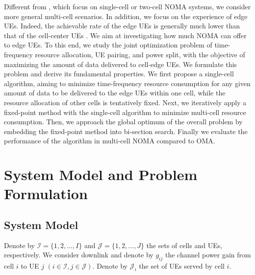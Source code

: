\documentclass[10pt,journal,final,finalsubmission,twocolumn]{IEEEtran}
\begin{document}
Different from \cite{Do1, Do2, Guo, Pei}, which focus on single-cell or two-cell NOMA systems, we consider more general multi-cell scenarios. In addition, we focus on the experience of edge UEs. Indeed, the achievable rate of the edge UEs is generally much lower than that of the cell-center UEs \cite{Dai}. We aim at investigating how much NOMA can offer to edge UEs. To this end, we study the joint optimization problem of time-frequency resource allocation, UE pairing, and power split, with the objective of maximizing the amount of data delivered to cell-edge UEs. We formulate this problem and derive its fundamental properties. We first propose a single-cell algorithm, aiming to minimize time-frequency resource consumption for any given amount of data to be delivered to the edge UEs within one cell, while the resource allocation of other cells is tentatively fixed. Next, we iteratively apply a fixed-point method with the single-cell algorithm to minimize multi-cell resource consumption. Then, we approach the global optimum of the overall problem by embedding the fixed-point method into bi-section search. Finally we evaluate the performance of the algorithm in multi-cell NOMA compared to OMA.

\section{System Model and Problem Formulation} \label{Sec:SystemModel}

\subsection{System Model}\label{Preliminaries}

Denote by $\mathcal{I} = \{1,2,...,I \}$ and $\mathcal{J} = \{1,2,...,J\}$ the sets of cells and UEs, respectively. 
We consider downlink and denote by $g_{ij}$ the channel power gain from cell $i$ to UE $j$ $(i \in \mathcal{I}, j \in \mathcal{J})$. Denote by $\mathcal{J}_i$ the set of UEs served by cell $i$.
\end{document}
